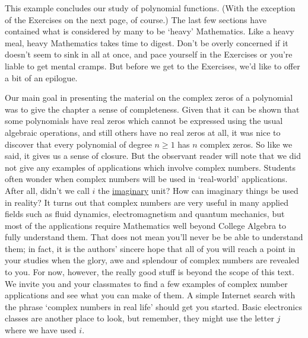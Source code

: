 \medskip

This example concludes our study of polynomial functions. (With the exception of the Exercises on the next page, of course.)  The last few sections have contained what is considered by many to be `heavy' Mathematics.  Like a heavy meal, heavy Mathematics takes time to digest.  Don't be overly concerned if it doesn't seem to sink in all at once, and pace yourself in the Exercises or you're liable to get mental cramps.  But before we get to the Exercises, we'd like to offer a bit of an epilogue.  

\medskip

\label{complexepilogue}

Our main goal in presenting the material on the complex zeros of a polynomial was to give the chapter a sense of completeness.  Given that it can be shown that some polynomials have real zeros which cannot be expressed using the usual algebraic operations, and still others have no real zeros at all, it was nice to discover that every polynomial of degree $n \geq 1$ has $n$ complex zeros.  So like we said, it gives us a sense of closure.  But the observant reader will note that we did not give any examples of applications which involve complex numbers. Students often wonder when complex numbers will be used in `real-world' applications.  After all, didn't we call $i$ the \underline{imaginary} unit?  How can imaginary things be used in reality?  It turns out that complex numbers are very useful in many applied fields such as fluid dynamics, electromagnetism and quantum mechanics, but most of the applications require Mathematics well beyond College Algebra to fully understand them.  That does not mean you'll never be be able to understand them; in fact, it is the authors' sincere hope that all of you will reach a point in your studies when the glory, awe and splendour of complex numbers are revealed to you.  For now, however, the really good stuff is beyond the scope of this text. We invite you and your classmates to find a few examples of complex number applications and see what you can make of them.  A simple Internet search with the phrase `complex numbers in real life' should get you started.  Basic electronics classes are another place to look, but remember, they might use the letter $j$ where we have used $i$.

\medskip

